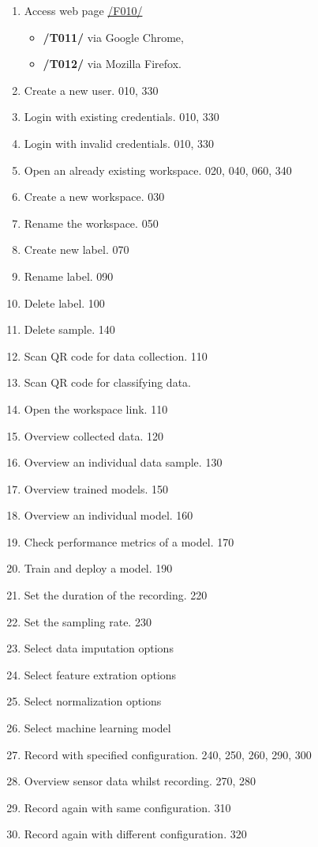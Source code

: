 \begin{enumerate}[{label = \textbf{/T{\protect\twodigits{\arabic{enumi}}}0/}, leftmargin = *}]
    \item Access web page \hyperref[/F010/]{/F010/}
    \begin{itemize}
        \item \textbf{/T011/} via Google Chrome,
        \item \textbf{/T012/} via Mozilla Firefox.
    \end{itemize}
    \item Create a new user. 010, 330
    \item Login with existing credentials. 010, 330
    \item Login with invalid credentials. 010, 330
    \item Open an already existing workspace. 020, 040, 060, 340
    \item Create a new workspace. 030
    \item Rename the workspace. 050
    \item Create new label. 070
    \item Rename label. 090
    \item Delete label. 100
    \item Delete sample. 140
    \item Scan QR code for data collection. 110
    \item Scan QR code for classifying data. 
    \item Open the workspace link. 110
    \item Overview collected data. 120
    \item Overview an individual data sample. 130
    \item Overview trained models. 150
    \item Overview an individual model. 160
    \item Check performance metrics of a model. 170
    \item Train and deploy a model. 190
    \item Set the duration of the recording. 220
    \item Set the sampling rate. 230
    \item Select data imputation options
    \item Select feature extration options
    \item Select normalization options
    \item Select machine learning model
    \item Record with specified configuration. 240, 250, 260, 290, 300
    \item Overview sensor data whilst recording. 270, 280
    \item Record again with same configuration. 310
    \item Record again with different configuration. 320
\end{enumerate}
